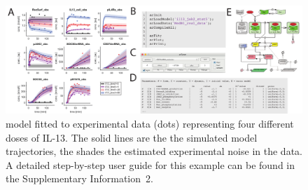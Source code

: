 \documentclass{bioinfo}
\begin{document}
\begin{figure}[!tpb]%
\centerline{\includegraphics[width=\linewidth]{Figure_D2D_AppNote_v2.pdf}}
\caption{\citet{Raia:2011vn} model fitted to experimental data (dots) representing four different doses of IL-13. The solid lines are the the simulated model trajectories, the shades the estimated experimental noise in the data. A detailed step-by-step user guide for this example can be found in the Supplementary Information~2.}\label{fig:01}
\end{figure}
\end{document}
